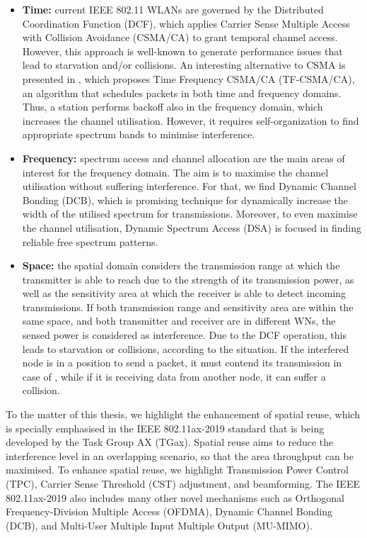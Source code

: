 \documentclass[12pt, a4paper,twoside]{tesi_upf}
\begin{document}
		\begin{itemize}
			\item \textbf{Time:} current IEEE 802.11 WLANs are governed by the Distributed Coordination Function (DCF), which applies Carrier Sense Multiple Access with Collision Avoidance (CSMA/CA) to grant temporal channel access. However, this approach is well-known to generate performance issues that lead to starvation and/or collisions. An interesting alternative to CSMA is presented in \cite{herzen2015csma}, which proposes Time Frequency CSMA/CA (TF-CSMA/CA), an algorithm that schedules packets in both time and frequency domains. Thus, a station performs backoff also in the frequency domain, which increases the channel utilisation. However, it requires self-organization to find appropriate spectrum bands to minimise interference.
			\item \textbf{Frequency:} spectrum access and channel allocation are the main areas of interest for the frequency domain. The aim is to maximise the channel utilisation without suffering interference. For that, we find Dynamic Channel Bonding (DCB), which is promising technique for dynamically increase the width of the utilised spectrum for transmissions. Moreover, to even maximise the channel utilisation, Dynamic Spectrum Access (DSA) is focused in finding reliable free spectrum patterns.
			\item \textbf{Space:} the spatial domain considers the transmission range at which the transmitter is able to reach due to the strength of its transmission power, as well as the sensitivity area at which the receiver is able to detect incoming transmissions. If both transmission range and sensitivity area are within the same space, and both transmitter and receiver are in different WNs, the sensed power is considered as interference. Due to the DCF operation, this leads to starvation or collisions, according to the situation. If the interfered node is in a position to send a packet, it must contend its transmission in case of , while if it is receiving data from another node, it can suffer a collision.
		\end{itemize}
		
		To the matter of this thesis, we highlight the enhancement of spatial reuse, which is specially emphasised in the IEEE 802.11ax-2019 standard that is being developed by the Task Group AX (TGax). Spatial reuse aims to reduce the interference level in an overlapping scenario, so that the area throughput can be maximised. To enhance spatial reuse, we highlight Transmission Power Control (TPC), Carrier Sense Threshold (CST) adjustment, and beamforming. The IEEE 802.11ax-2019 also includes many other novel mechanisms such as Orthogonal Frequency-Division Multiple Access (OFDMA), Dynamic Channel Bonding (DCB), and Multi-User Multiple Input Multiple Output (MU-MIMO). 
		
\end{document}
